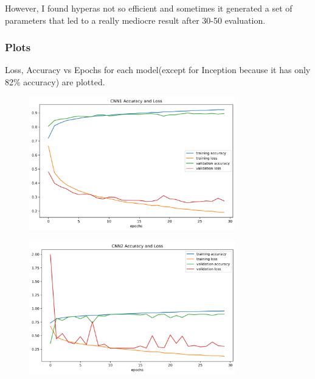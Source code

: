 \documentclass[12pt]{article}
\begin{document}
However, I found hyperas not so efficient and sometimes it generated a set of parameters that led to a really mediocre result after 30-50 evaluation.

\subsubsection{Plots}
Loss, Accuracy vs Epochs for each model(except for Inception because it has only 82\% accuracy) are plotted.
\begin{figure}[H]
\begin{center}
    \includegraphics[width=0.8\textwidth]{../plots/CNN1_Result.png}
\end{center}
\end{figure}
\begin{figure}[H]
\begin{center}
    \includegraphics[width=0.8\textwidth]{../plots/CNN2_Result.png}
\end{center}
\end{figure}
\end{document}
